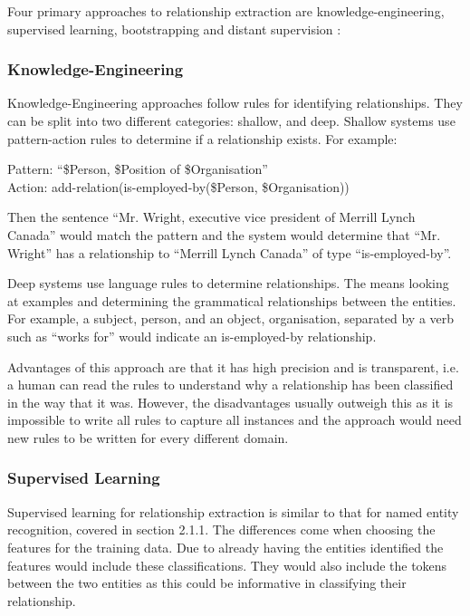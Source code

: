 \documentclass[11pt,oneside]{book}
\begin{document}
Four primary approaches to relationship extraction are knowledge-engineering, supervised learning, bootstrapping and distant supervision \citep{text_processing_lecture_6}:

\subsubsection{Knowledge-Engineering}

Knowledge-Engineering approaches follow rules for identifying relationships. They can be split into two different categories: shallow, and deep. Shallow systems use pattern-action rules to determine if a relationship exists. For example:

\begin{displayquote}
Pattern: “\$Person, \$Position of \$Organisation”
\\Action: add-relation(is-employed-by(\$Person, \$Organisation))
\end{displayquote}

\noindent Then the sentence “Mr. Wright, executive vice president of Merrill Lynch Canada” would match the pattern and the system would determine that “Mr. Wright” has a relationship to “Merrill Lynch Canada” of type “is-employed-by”.

Deep systems use language rules to determine relationships. The means looking at examples and determining the grammatical relationships between the entities. For example, a subject, person, and an object, organisation, separated by a verb such as “works for” would indicate an is-employed-by relationship.

Advantages of this approach are that it has high precision and is transparent, i.e. a human can read the rules to understand why a relationship has been classified in the way that it was. However, the disadvantages usually outweigh this as it is impossible to write all rules to capture all instances and the approach would need new rules to be written for every different domain.

\subsubsection{Supervised Learning}

Supervised learning for relationship extraction is similar to that for named entity recognition, covered in section 2.1.1. The differences come when choosing the features for the training data. Due to already having the entities identified the features would include these classifications. They would also include the tokens between the two entities as this could be informative in classifying their relationship.
\end{document}
